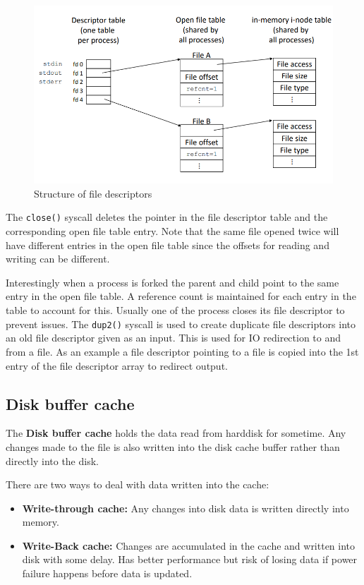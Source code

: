 \documentclass[12pt]{article}
\begin{document}
\begin{figure}[H]
    \centering
    \includegraphics[width = 12cm]{open_file_table.png}
    \caption{Structure of file descriptors}
\end{figure}

The \texttt{close()} syscall deletes the pointer in the file descriptor table and the corresponding open file table entry. Note that the same file opened twice will have different entries in the open file table since the offsets for reading and writing can be different. 

Interestingly when a process is forked the parent and child point to the same entry in the open file table. A reference count is maintained for each entry in the table to account for this. Usually one of the process closes its file descriptor to prevent issues. 
The \texttt{dup2()} syscall is used to create duplicate file descriptors into an old file descriptor given as an input. This is used for IO redirection to and from a file. As an example a file descriptor pointing to a file is copied into the 1st entry of the file descriptor array to redirect output.    

\subsection{Disk buffer cache}
The \textbf{Disk buffer cache} holds the data read from harddisk for sometime. Any changes made to the file is also written into the disk cache buffer rather than directly into the disk. 

There are two ways to deal with data written into the cache:
\begin{itemize}
    \item \textbf{Write-through cache:} Any changes into disk data is written directly into memory. 
    \item \textbf{Write-Back cache:} Changes are accumulated in the cache and written into disk with some delay. Has better performance but risk of losing data if power failure happens before data is updated. 
\end{itemize}
\end{document}
